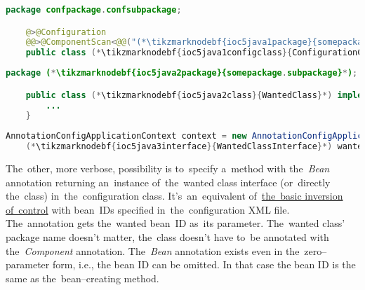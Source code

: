 \begin{lstlisting}[language=Java, title={Configuration class}]
    package confpackage.confsubpackage;

    @>@Configuration
    @@>@ComponentScan<@@("(*\tikzmarknodebf{ioc5java1package}{somepackage.subpackage}[ForestGreen]*)")
    public class (*\tikzmarknodebf{ioc5java1configclass}{ConfigurationClass}*) {}
\end{lstlisting}
\begin{lstlisting}[language=Java, title={Wanted class}]
    package (*\tikzmarknodebf{ioc5java2package}{somepackage.subpackage}*);

    public class (*\tikzmarknodebf{ioc5java2class}{WantedClass}*) implements (*\tikzmarknodebf{ioc5java2interface}{WantedClassInterface}*) {
        ...
    }
\end{lstlisting}
\begin{lstlisting}[language=Java, title={Usage}]
    AnnotationConfigApplicationContext context = new AnnotationConfigApplicationContext((*\tikzmarknodebf{ioc5java3configclass}{ConfigurationClass}*).class);
    (*\tikzmarknodebf{ioc5java3interface}{WantedClassInterface}*) wantedClassInstance = context.getBean("(*\tikzmarknodebf{ioc5java3beanid}{wantedClass}[ForestGreen]*)", (*\tikzmarknodebf{ioc5java3interface2}{WantedClassInterface}*).class);
\end{lstlisting}

\noindent The~other, more verbose, possibility is to~specify a~method with the~\textit{Bean} annotation returning an~instance of~the~wanted class interface (or~directly the~class) in~the~configuration class. It's~an~equivalent of~\hyperref[inversionofcontrol]{the~basic inversion of~control} with bean~IDs specified in~the~configuration XML file. The~annotation gets the~wanted bean~ID as~its parameter. The~wanted class' package name doesn't matter, the~class doesn't have to~be annotated with the~\textit{Component} annotation. The~\textit{Bean} annotation exists even in the~zero--parameter form, i.e., the bean ID can be omitted. In that case the bean ID is the same as the~bean--creating method.
\newpage

